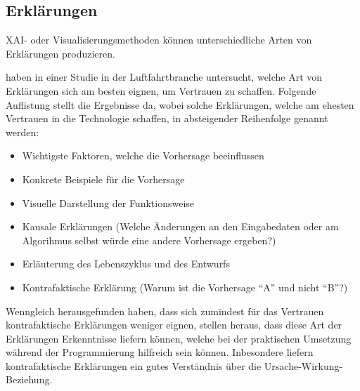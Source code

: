 \subsection{Erklärungen}
XAI- oder Visualisierungsmethoden können unterschiedliche Arten von Erklärungen produzieren. 

\cite{hernandez2021explainable} haben in einer Studie in der Luftfahrtbranche untersucht, welche Art von Erklärungen sich am besten eignen, um Vertrauen zu schaffen. Folgende Auflistung stellt die Ergebnisse da, wobei solche Erklärungen, welche am ehesten Vertrauen in die Technologie schaffen, in absteigender Reihenfolge genannt werden:
\begin{itemize}
    \item Wichtigste Faktoren, welche die Vorhersage beeinflussen
    \item Konkrete Beispiele für die Vorhersage
    \item Visuelle Darstellung der Funktionsweise
    \item Kausale Erklärungen (Welche Änderungen an den Eingabedaten oder am Algorihmus selbst würde eine andere Vorhersage ergeben?)
    \item Erläuterung des Lebenszyklus und des Entwurfs
    \item Kontrafaktische Erklärung (Warum ist die Vorhersage \enquote{A} und nicht \enquote{B}?)
\end{itemize}

Wenngleich \cite{hernandez2021explainable} herausgefunden haben, dass sich zumindest für das Vertrauen kontrafaktische Erklärungen weniger eignen, stellen \cite{tsiakmaki2021case} heraus, dass diese Art der Erklärungen Erkenntnisse liefern können, welche bei der praktischen Umsetzung während der Programmierung hilfreich sein können. Inbesondere liefern kontrafaktische Erklärungen ein gutes Verständnis über die Ursache-Wirkung-Beziehung.
